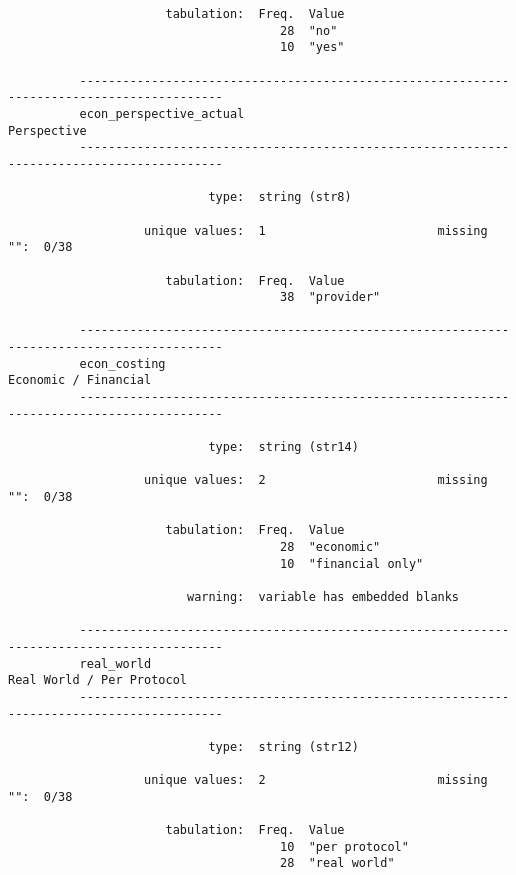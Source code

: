 \documentclass{article}
\begin{document}
\begin{verbatim}
                      tabulation:  Freq.  Value
                                      28  "no"
                                      10  "yes"
          
          ------------------------------------------------------------------------------------------
          econ_perspective_actual                                                        Perspective
          ------------------------------------------------------------------------------------------
          
                            type:  string (str8)
          
                   unique values:  1                        missing "":  0/38
          
                      tabulation:  Freq.  Value
                                      38  "provider"
          
          ------------------------------------------------------------------------------------------
          econ_costing                                                          Economic / Financial
          ------------------------------------------------------------------------------------------
          
                            type:  string (str14)
          
                   unique values:  2                        missing "":  0/38
          
                      tabulation:  Freq.  Value
                                      28  "economic"
                                      10  "financial only"
          
                         warning:  variable has embedded blanks
          
          ------------------------------------------------------------------------------------------
          real_world                                                       Real World / Per Protocol
          ------------------------------------------------------------------------------------------
          
                            type:  string (str12)
          
                   unique values:  2                        missing "":  0/38
          
                      tabulation:  Freq.  Value
                                      10  "per protocol"
                                      28  "real world"
          

\end{verbatim}
\end{document}
